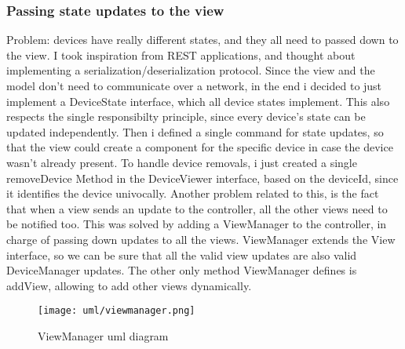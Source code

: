 \subsubsection{Passing state updates to the view}
Problem: devices have really different states, and they all need to passed down to the view.
I took inspiration from REST applications, and thought about implementing a  serialization/deserialization protocol.
Since the view and the model don't need to communicate over a network, in the end i decided to just implement a DeviceState interface, 
which all device states implement. This also respects the single responsibilty principle, since every device's state can be updated independently.
Then i defined a single command for state updates, so that the view could create a component for the specific device in case
the device wasn't already present. To handle device removals, i just created a single removeDevice Method in the DeviceViewer interface, 
based on the deviceId, since it identifies the device univocally. \newline 
Another problem related to this, is the fact that when a view sends an update to the controller, all the other views need to be notified
too. This was solved by adding a ViewManager to the controller, in charge of passing down updates to all the views. 
ViewManager extends the View interface, so we can be sure that all the valid view updates are also valid DeviceManager updates.
The other only method ViewManager defines is addView, allowing to add other views dynamically.

\begin{figure}[H]
\centering{}
\texttt{[image: uml/viewmanager.png]}
\caption{ViewManager uml diagram}
\label{ceccacci:uml:view}
\end{figure}
